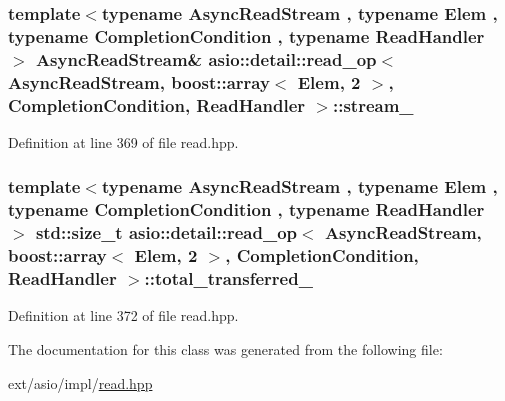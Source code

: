 \subsubsection[{stream\+\_\+}]{\setlength{\rightskip}{0pt plus 5cm}template$<$typename Async\+Read\+Stream , typename Elem , typename Completion\+Condition , typename Read\+Handler $>$ Async\+Read\+Stream\& {\bf asio\+::detail\+::read\+\_\+op}$<$ Async\+Read\+Stream, {\bf boost\+::array}$<$ Elem, 2 $>$,                           Completion\+Condition, Read\+Handler $>$\+::stream\+\_\+}\label{classasio_1_1detail_1_1read__op_3_01_async_read_stream_00_01boost_1_1array_3_01_elem_00_012_01_4b92266d3d5081f809423aa72530eb694_ae1ff805a209a3733d72034de4653d49d}


Definition at line 369 of file read.\+hpp.

\hypertarget{classasio_1_1detail_1_1read__op_3_01_async_read_stream_00_01boost_1_1array_3_01_elem_00_012_01_4b92266d3d5081f809423aa72530eb694_a049016ef13e857b0d5875dc63e5fd053}{}
\subsubsection[{total\+\_\+transferred\+\_\+}]{\setlength{\rightskip}{0pt plus 5cm}template$<$typename Async\+Read\+Stream , typename Elem , typename Completion\+Condition , typename Read\+Handler $>$ std\+::size\+\_\+t {\bf asio\+::detail\+::read\+\_\+op}$<$ Async\+Read\+Stream, {\bf boost\+::array}$<$ Elem, 2 $>$,                           Completion\+Condition, Read\+Handler $>$\+::total\+\_\+transferred\+\_\+}\label{classasio_1_1detail_1_1read__op_3_01_async_read_stream_00_01boost_1_1array_3_01_elem_00_012_01_4b92266d3d5081f809423aa72530eb694_a049016ef13e857b0d5875dc63e5fd053}


Definition at line 372 of file read.\+hpp.



The documentation for this class was generated from the following file\+:\begin{DoxyCompactItemize}
\item 
ext/asio/impl/\hyperlink{impl_2read_8hpp}{read.\+hpp}\end{DoxyCompactItemize}
